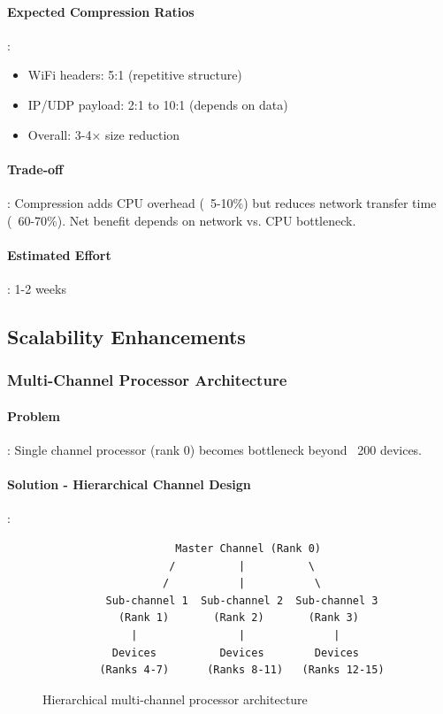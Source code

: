 \paragraph{Expected Compression Ratios}:
\begin{itemize}
    \item WiFi headers: 5:1 (repetitive structure)
    \item IP/UDP payload: 2:1 to 10:1 (depends on data)
    \item Overall: 3-4× size reduction
\end{itemize}

\paragraph{Trade-off}:
Compression adds CPU overhead (~5-10\%) but reduces network transfer time (~60-70\%). Net benefit depends on network vs. CPU bottleneck.

\paragraph{Estimated Effort}: 1-2 weeks

\subsection{Scalability Enhancements}

\subsubsection{Multi-Channel Processor Architecture}

\paragraph{Problem}:
Single channel processor (rank 0) becomes bottleneck beyond ~200 devices.

\paragraph{Solution - Hierarchical Channel Design}:

\begin{figure}[htbp]
\centering
\begin{verbatim}
                     Master Channel (Rank 0)
                    /          |          \
                   /           |           \
          Sub-channel 1  Sub-channel 2  Sub-channel 3
            (Rank 1)       (Rank 2)       (Rank 3)
              |                |              |
           Devices          Devices        Devices
         (Ranks 4-7)      (Ranks 8-11)   (Ranks 12-15)
\end{verbatim}
\caption{Hierarchical multi-channel processor architecture}
\end{figure}

